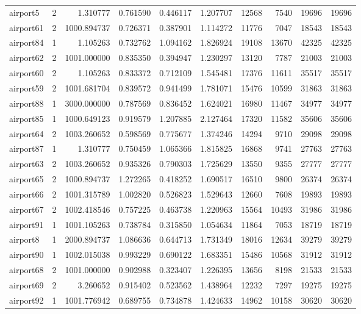\begin{longtable}{|l|r|r|r|r|r|r|r|r|r|}
airport5 & 2 & 1.310777 & 0.761590 & 0.446117 & 1.207707 & 12568 & 7540 & 19696 & 19696 \\
airport61 & 2 & 1000.894737 & 0.726371 & 0.387901 & 1.114272 & 11776 & 7047 & 18543 & 18543 \\
airport84 & 1 & 1.105263 & 0.732762 & 1.094162 & 1.826924 & 19108 & 13670 & 42325 & 42325 \\
airport62 & 2 & 1001.000000 & 0.835350 & 0.394947 & 1.230297 & 13120 & 7787 & 21003 & 21003 \\
airport60 & 2 & 1.105263 & 0.833372 & 0.712109 & 1.545481 & 17376 & 11611 & 35517 & 35517 \\
airport59 & 2 & 1001.681704 & 0.839572 & 0.941499 & 1.781071 & 15476 & 10599 & 31863 & 31863 \\
airport88 & 1 & 3000.000000 & 0.787569 & 0.836452 & 1.624021 & 16980 & 11467 & 34977 & 34977 \\
airport85 & 1 & 1000.649123 & 0.919579 & 1.207885 & 2.127464 & 17320 & 11582 & 35606 & 35606 \\
airport64 & 2 & 1003.260652 & 0.598569 & 0.775677 & 1.374246 & 14294 & 9710 & 29098 & 29098 \\
airport87 & 1 & 1.310777 & 0.750459 & 1.065366 & 1.815825 & 16868 & 9741 & 27763 & 27763 \\
airport63 & 2 & 1003.260652 & 0.935326 & 0.790303 & 1.725629 & 13550 & 9355 & 27777 & 27777 \\
airport65 & 2 & 1000.894737 & 1.272265 & 0.418252 & 1.690517 & 16510 & 9800 & 26374 & 26374 \\
airport66 & 2 & 1001.315789 & 1.002820 & 0.526823 & 1.529643 & 12660 & 7608 & 19893 & 19893 \\
airport67 & 2 & 1002.418546 & 0.757225 & 0.463738 & 1.220963 & 15564 & 10493 & 31986 & 31986 \\
airport91 & 1 & 1001.105263 & 0.738784 & 0.315850 & 1.054634 & 11864 & 7053 & 18719 & 18719 \\
airport8 & 1 & 2000.894737 & 1.086636 & 0.644713 & 1.731349 & 18016 & 12634 & 39279 & 39279 \\
airport90 & 1 & 1002.015038 & 0.993229 & 0.690122 & 1.683351 & 15486 & 10568 & 31912 & 31912 \\
airport68 & 2 & 1001.000000 & 0.902988 & 0.323407 & 1.226395 & 13656 & 8198 & 21533 & 21533 \\
airport69 & 2 & 3.260652 & 0.915402 & 0.523562 & 1.438964 & 12232 & 7297 & 19275 & 19275 \\
airport92 & 1 & 1001.776942 & 0.689755 & 0.734878 & 1.424633 & 14962 & 10158 & 30620 & 30620 \\

\end{longtable}
